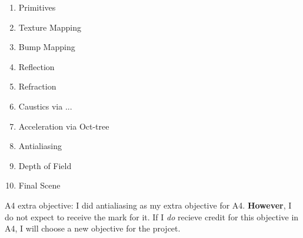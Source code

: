 \documentclass {article}
\begin{document}
\begin{enumerate}
     \item Primitives
     \item Texture Mapping
     \item Bump Mapping
     \item Reflection
     \item Refraction
     \item Caustics via ...
     \item Acceleration via Oct-tree
     \item Antialiasing
     \item Depth of Field
     \item Final Scene
\end{enumerate}


A4 extra objective: I did antialiasing as my extra objective for A4. \textbf{However}, I do not expect to receive the mark for it. If I \textit{do} recieve credit for this objective in A4, I will choose a new objective for the projcet.
\end{document}
